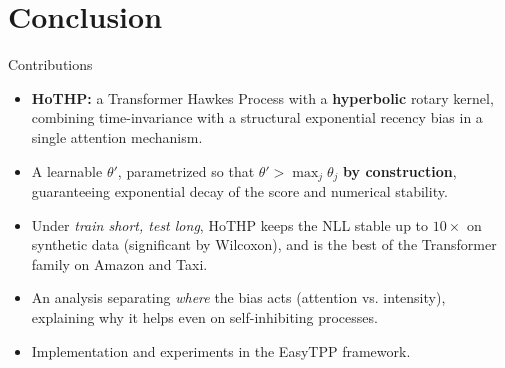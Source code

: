 \documentclass[aspectratio=169]{beamer}
\begin{document}
\section{Conclusion}

\begin{frame}{Contributions}
  \begin{itemize}
    \item \textbf{HoTHP:} a Transformer Hawkes Process with a \textbf{hyperbolic}
          rotary kernel, combining time-invariance with a structural exponential
          recency bias in a single attention mechanism.
    \item A learnable $\theta'$, parametrized so that $\theta' > \max_j \theta_j$
          \textbf{by construction}, guaranteeing exponential decay of the score
          and numerical stability.
    \item Under \emph{train short, test long}, HoTHP keeps the NLL stable up to
          $10\times$ on synthetic data (significant by Wilcoxon), and is the best
          of the Transformer family on Amazon and Taxi.
    \item An analysis separating \emph{where} the bias acts (attention vs.
          intensity), explaining why it helps even on self-inhibiting processes.
    \item Implementation and experiments in the EasyTPP framework.
  \end{itemize}
\end{frame}
\end{document}
